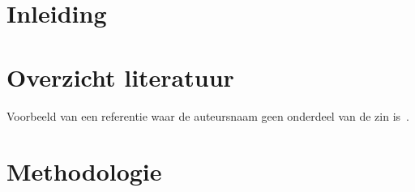 \documentclass{hogent-article}
\affiliation{
  \textsuperscript{1} \href{mailto:liam.goethals@student.hogent.be}{liam.goethals@student.hogent.be}}
\begin{document}
\flushbottom %
\maketitle %
\tableofcontents %
\thispagestyle{empty} %


\section{Inleiding}


\lipsum[1-3]

\section{Overzicht literatuur}


Voorbeeld van een referentie waar de auteursnaam geen onderdeel van de zin is~\autocite{Moore2002}.

\lipsum[4-9]

\section{Methodologie}


\lipsum[10-12]
\end{document}

